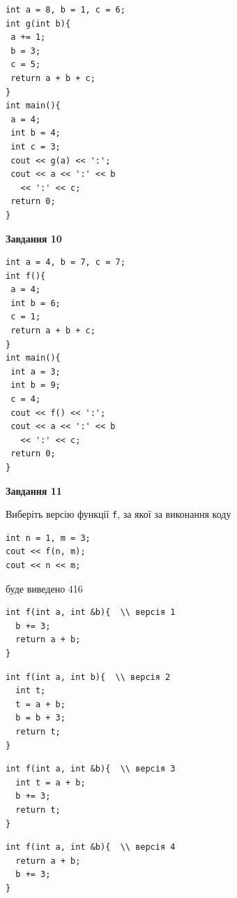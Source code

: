 \documentclass[12pt, ukrainian]{article}
\def\code#1{\Verb!#1!}
\begin{document}
{\begin {large}
\begin{minipage}[t]{7.0cm}
\begin{verbatim}
int a = 8, b = 1, c = 6;
int g(int b){
 a += 1;
 b = 3;
 c = 5;
 return a + b + c;
}
int main(){
 a = 4;
 int b = 4;
 int c = 3;
 cout << g(a) << ':';
 cout << a << ':' << b 
   << ':' << c;
 return 0;
}
\end{verbatim}



\begin{center}
\textbf{Завдання 10}
\end{center}
\vspace{-8mm}

\begin{verbatim}
int a = 4, b = 7, c = 7;
int f(){
 a = 4;
 int b = 6;
 c = 1;
 return a + b + c;
}
int main(){
 int a = 3;
 int b = 9;
 c = 4;
 cout << f() << ':';
 cout << a << ':' << b 
   << ':' << c;
 return 0;
}
\end{verbatim}

\end{minipage}
\vline \hspace{1mm}
\begin{minipage}[t]{11.0cm}

\begin{center}
\textbf{Завдання 11}
\end{center}
Виберіть версію функції \code{f}, за якої за виконання коду
\begin{verbatim}
int n = 1, m = 3;
cout << f(n, m);
cout << n << m;
\end{verbatim}

буде виведено 416

\begin{verbatim}
int f(int a, int &b){  \\ версія 1
  b += 3;
  return a + b;
}
\end{verbatim}

\vspace{-8mm}\begin{verbatim}
int f(int a, int b){  \\ версія 2
  int t;
  t = a + b;
  b = b + 3;
  return t;
}
\end{verbatim}

\vspace{-8mm}\begin{verbatim}
int f(int a, int &b){  \\ версія 3
  int t = a + b;
  b += 3;
  return t;
}
\end{verbatim}

\vspace{-8mm}\begin{verbatim}
int f(int a, int &b){  \\ версія 4
  return a + b;
  b += 3;
}
\end{verbatim}




\end{minipage}
\end{large}}
\end{document}
